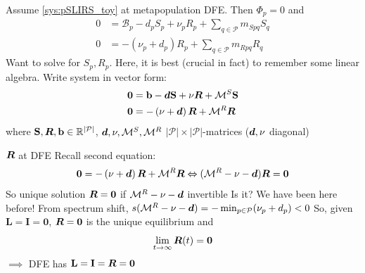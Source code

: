 \documentclass[aspectratio=169]{beamer}\usepackage[]{graphicx}\usepackage[]{xcolor}
\begin{document}

\begin{frame}{}
Assume \eqref{sys:pSLIRS_toy} at metapopulation DFE. Then $\Phi_p=0$ and 
\begin{align*}
0 &=\mathcal{B}_p-d_pS_p+\nu_pR_p
+\textstyle{\sum_{q\in\mathcal{P}}} m_{Spq}S_{q} \\
0 &=-\left(\nu_{p}+d_{p}\right)R_{p}
+\textstyle{\sum_{q\in\mathcal{P}}} m_{Rpq}R_{q}
\end{align*}
Want to solve for $S_p,R_p$. Here, it is best (crucial in fact) to remember some linear algebra. Write system in vector form:
\begin{align*}
\mathbf{0} &=\mathbf{b}-\bm{d}\mathbf{S}+\mathbf{\nu}\bm{R}+\mathcal{M}^S\mathbf{S} \\
\mathbf{0} &=-\left(\mathbf{\nu}+\bm{d}\right)\bm{R}+\mathcal{M}^R\bm{R}
\end{align*}
where $\mathbf{S},\bm{R},\mathbf{b}\in\mathbb{R}^{|\mathcal{P}|}$, $\bm{d},\mathbf{\nu},\mathcal{M}^S,\mathcal{M}^R$ $|\mathcal{P}|\times|\mathcal{P}|$-matrices ($\bm{d},\mathbf{\nu}$ diagonal)
\end{frame}

\begin{frame}{$\bm{R}$ at DFE}
Recall second equation:
$$
\mathbf{0} =-\left(\mathbf{\nu}+\bm{d}\right)\bm{R}+\mathcal{M}^R\bm{R} \Leftrightarrow (\mathcal{M}^R-\mathbf{\nu}-\bm{d})\bm{R}=\mathbf{0}
$$
\vfill
So unique solution $\bm{R}=\mathbf{0}$ if $\mathcal{M}^R-\mathbf{\nu}-\bm{d}$ invertible
Is it?
\vfill
We have been here before! 
\vfill
From spectrum shift, $s(\mathcal{M}^R-\mathbf{\nu}-\bm{d})=-\min_{p\in\mathcal{P}}(\nu_p+d_p)<0$
\vfill
So, given $\mathbf{L}=\mathbf{I}=\mathbf{0}$, $\bm{R}=\mathbf{0}$ is the unique equilibrium and
$$
\lim_{t\to\infty}\bm{R}(t)=\mathbf{0}
$$
\vfill
$\implies$ DFE has $\mathbf{L}=\mathbf{I}=\bm{R}=\mathbf{0}$
\end{frame}
\end{document}
